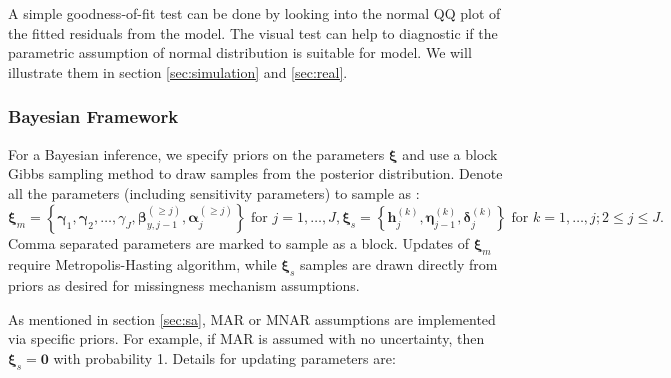 \documentclass[12pt]{article}
\begin{document}
A simple goodness-of-fit test can be done by looking into the normal
QQ plot of the fitted residuals from the model. The visual test can
help to diagnostic if the parametric assumption of normal distribution
is suitable for model. We will illustrate them in section
\ref{sec:simulation} and \ref{sec:real}.

\subsubsection{Bayesian Framework}
\label{sec:bayesian}

For a Bayesian inference, we specify priors on the parameters $\bm
\xi$ and use a block Gibbs sampling method to draw samples from the
posterior distribution. Denote all the parameters (including
sensitivity parameters) to sample as :
\begin{displaymath}
  \bm \xi_m = \left\{ \bm \gamma_1, \bm \gamma_2, \ldots, \gamma_J,
    \bm \beta_{y,j-1}^{(\geq j)}, \bm \alpha_j^{(\geq j)} \right\}
  \text{ for } j = 1, \ldots, J ,
  \bm \xi_s = \left\{ \bm h_j^{(k)}, \bm \eta_{j-1}^{(k)}, \bm \delta_j^{(k)}
  \right\}
  \text{ for } k = 1, \ldots, j; 2 \leq j \leq J.
\end{displaymath}
Comma separated parameters are marked to sample as a block.  Updates
of $\bm \xi_m$ require Metropolis-Hasting algorithm, while $\bm \xi_s$
samples are drawn directly from priors as desired for missingness
mechanism assumptions.

As mentioned in section \ref{sec:sa}, MAR or MNAR assumptions are
implemented via specific priors. For example, if MAR is assumed with
no uncertainty, then $ \bm \xi _s= \bm 0$ with probability 1. Details
for updating parameters are:
\end{document}
